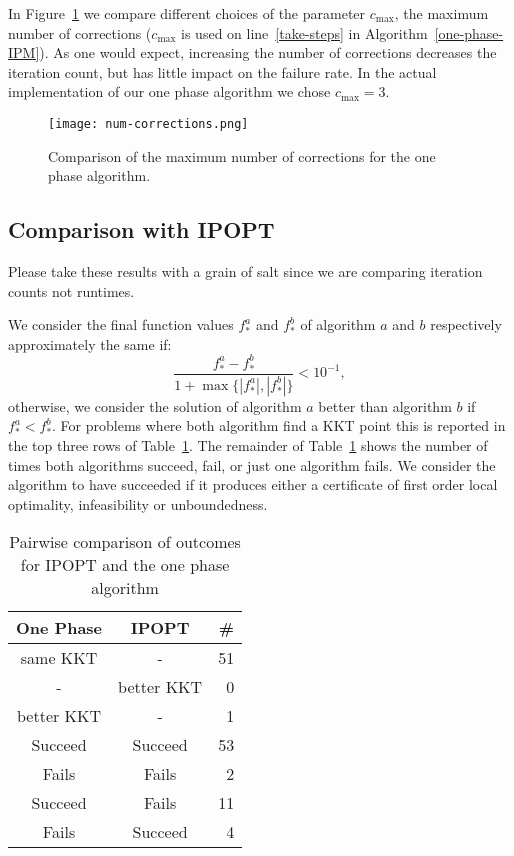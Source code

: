 \documentclass{article}
\begin{document}
In Figure~\ref{fig:num-corrections} we compare different choices of the parameter $c_{\max}$, the maximum number of corrections ($c_{\max}$ is used on line~\ref{take-steps} in Algorithm~\ref{one-phase-IPM}). As one would expect, increasing the number of corrections decreases the iteration count, but has little impact on the failure rate. In the actual implementation of our one phase algorithm we chose $c_{\max}=3$.

\begin{figure}[H]
\texttt{[image: num-corrections.png]}
\caption{Comparison of the maximum number of corrections for the one phase algorithm.}\label{fig:num-corrections}
\end{figure}

\subsection{Comparison with IPOPT}\label{alg:comparison-IPOPT}

Please take these results with a grain of salt since we are comparing iteration counts not runtimes.



We consider the final function values $f^{a}_{*}$ and $f^{b}_{*}$ of algorithm $a$ and $b$ respectively approximately the same if:
$$
\frac{f^{a}_{*} - f^{b}_{*}}{1 + \max \{ | f^{a}_{*} |, | f^{b}_{*} | \} } < 10^{-1},
$$
otherwise, we consider the solution of algorithm $a$ better than algorithm $b$ if $f^{a}_{*}  < f^{b}_{*}$. For problems where both algorithm find a KKT point this is reported in the top three rows of Table~\ref{tbl:pairwise-outcomes}. The remainder of Table~\ref{tbl:pairwise-outcomes} shows the number of times both algorithms succeed, fail, or just one algorithm fails. We consider the algorithm to have succeeded if it produces either a certificate of first order local optimality, infeasibility or unboundedness.

\begin{table}[H]
\caption{Pairwise comparison of outcomes for IPOPT and the one phase algorithm}\label{tbl:pairwise-outcomes}
\begin{tabular}{ c c r }
  One Phase &  IPOPT &  \# \\
  \hline
same KKT & - & 51  \\
- & better KKT & 0 \\
better KKT & - &  1 \\
\hline
Succeed & Succeed & 53 \\
Fails & Fails & 2 \\
Succeed & Fails & 11 \\
Fails & Succeed & 4 \\
\end{tabular}
\end{table}
\end{document}
